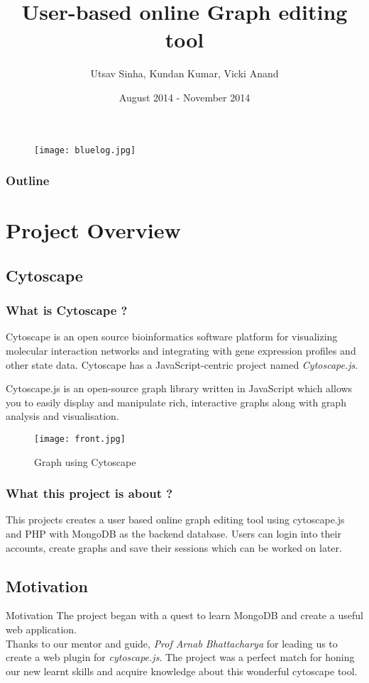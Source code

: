 \documentclass{beamer}
\title{User-based online Graph editing tool}
\date{August 2014 - November 2014}
\author{Utsav Sinha, Kundan Kumar, Vicki Anand}
\institute{CS252 Project}
\begin{document}
\begin{frame}
\titlepage
\end{frame}

\begin{frame}[plain]
\begin{figure}%
\texttt{[image: bluelog.jpg]}%
\end{figure}%
\end{frame}

\begin{frame}
\frametitle{Outline}
\tableofcontents[pausesections]
\end{frame}

\section{Project Overview}

\subsection{Cytoscape}
\begin{frame}
\frametitle{What is Cytoscape ?}

Cytoscape is an open source bioinformatics software platform for visualizing molecular interaction networks and integrating with gene expression profiles and other state data. Cytoscape has a JavaScript-centric project named \emph{Cytoscape.js}.

Cytoscape.js is an open-source graph library written in JavaScript which allows you to easily display and manipulate rich, interactive graphs along with graph analysis and visualisation.
\end{frame}

\begin{frame}
\begin{figure}
\centering
\texttt{[image: front.jpg]}
\caption{Graph using Cytoscape\label{front_image}\cite{front_image}}
\end{figure}
\end{frame}


\begin{frame}
\frametitle{What this project is about ?}
This projects creates a user based online graph editing tool using cytoscape.js and PHP with MongoDB as the backend database. Users can login into their accounts, create graphs and save their sessions which can be worked on later.
\end{frame}

\subsection{Motivation}
\begin{frame}{Motivation}
The project began with a quest to learn MongoDB and create a useful web application. \\
Thanks to our mentor and guide, \emph{Prof Arnab Bhattacharya} for leading us to create a web plugin for \emph{cytoscape.js}. The project was a perfect match for honing our new learnt skills and acquire knowledge about this wonderful cytoscape tool.
\end{frame}
\end{document}
